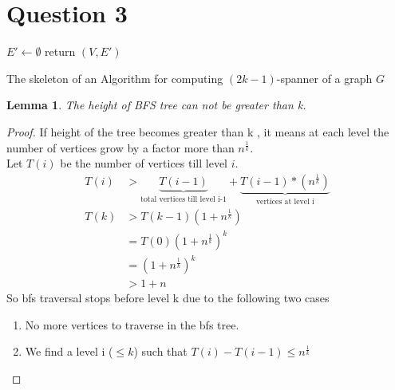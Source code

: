 \documentclass[11pt]{article}
\newtheorem{lemma}[theorem]{Lemma}
\begin{document}
\section*{Question 3}
\begin{algorithm}[h]
$E'\leftarrow \emptyset$\;
return $(V,E')$\;
\caption{The skeleton of an Algorithm for computing $(2k-1)$-spanner of a graph $G$}
\label{skeleton}
\end{algorithm}
\begin{lemma}
The height of BFS tree can not be greater than  k.
\end{lemma}
\begin{proof}
If height of the tree becomes greater than k , it means at each level the number of vertices grow by a factor more than $n^{\frac{1}{k}}$. \\ 
Let $T(i)$ be the number of vertices till level $i$.
\begin{align*}
T(i) &> \underbrace{T(i-1)}_{\text{total vertices till level i-1}} + \underbrace{T(i-1)*(n^{\frac{1}{k}})}_{\text{vertices at level i}} \\
T(k) &> T(k-1) (1 + n^{\frac{1}{k}}) \\
	&= T(0) (1 + n^{\frac{1}{k}})^{k} \\
	&= (1 + n^{\frac{1}{k}})^{k} \\
	&> 1 + n 
\end{align*}
So bfs traversal stops before level k due to the following two cases
\begin{enumerate}
\item No more vertices to traverse in the bfs tree. 
\item We find a level i ($\leq k$) such that $T(i) - T(i-1) \leq n^\frac{1}{k}$ 
\end{enumerate}
\end{proof}
\end{document}
